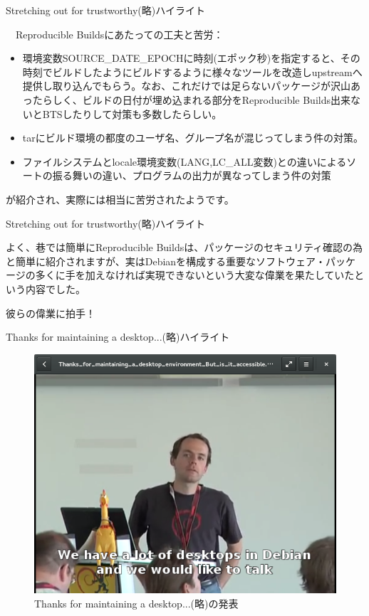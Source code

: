\begin{frame}{Stretching out for trustworthy(略)ハイライト}

　Reproducible Buildsにあたっての工夫と苦労：
\begin{itemize}
\item 環境変数SOURCE\_DATE\_EPOCHに時刻(エポック秒)を指定すると、その時刻でビルドしたようにビルドするように様々なツールを改造しupstreamへ提供し取り込んでもらう。なお、これだけでは足らないパッケージが沢山あったらしく、ビルドの日付が埋め込まれる部分をReproducible Builds出来ないとBTSしたりして対策も多数したらしい。
\item tarにビルド環境の都度のユーザ名、グループ名が混じってしまう件の対策。
\item ファイルシステムとlocale環境変数(LANG,LC\_ALL変数)との違いによるソートの振る舞いの違い、プログラムの出力が異なってしまう件の対策
\end{itemize}

が紹介され、実際には相当に苦労されたようです。

\end{frame}

\begin{frame}{Stretching out for trustworthy(略)ハイライト}

 よく、巷では簡単にReproducible Buildsは、パッケージのセキュリティ確認の為と簡単に紹介されますが、実はDebianを構成する重要なソフトウェア・パッケージの多くに手を加えなければ実現できないという大変な偉業を果たしていたという内容でした。
\begin{center}
\LARGE
 彼らの偉業に拍手！
\end{center}  
\end{frame}

\begin{frame}{Thanks for maintaining a desktop...(略)ハイライト}

\begin{figure}[H]
\begin{center}
\includegraphics[width=0.5\hsize]{image201510/accessibility.png}
\end{center}
\caption{Thanks for maintaining a desktop...(略)の発表}
\end{figure}

\end{frame}

